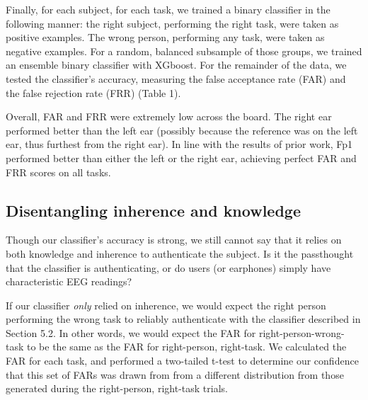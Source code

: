 \documentclass[11pt]{article}
\begin{document}
Finally, for each subject, for each task, we trained a binary classifier 
in the following manner: the right subject, performing the right task, were taken
as positive examples. The wrong person, performing any task, were taken as negative
examples. For a random, balanced subsample of those groups, we trained an ensemble
binary classifier with XGboost. For the remainder of the data, we tested the 
classifier's accuracy, measuring the false acceptance rate (FAR) and the false
rejection rate (FRR) (Table 1).

Overall, FAR and FRR were extremely low across the board. The right ear 
performed better than the left ear (possibly because the reference was on
the left ear, thus furthest from the right ear). In line with the 
results of prior work, Fp1 performed better than either the left or the right ear,
achieving perfect FAR and FRR scores on all tasks.

\subsection{Disentangling inherence and knowledge}
\label{sec:orga057897}

Though our classifier's accuracy is strong, we still cannot say that it relies 
on both knowledge and inherence to authenticate the subject. Is it the passthought
that the classifier is authenticating, or do users (or earphones) simply have characteristic
EEG readings? 

If our classifier \emph{only} relied on inherence, we would expect the right person performing
the wrong task to reliably authenticate with the classifier described in Section 5.2.
In other words, we would expect the FAR for right-person-wrong-task to be the same 
as the FAR for right-person, right-task. We calculated the FAR for each task, and performed
a two-tailed t-test to determine our confidence that this set of FARs was drawn from
from a different distribution from those generated during the right-person, right-task trials.
\end{document}
